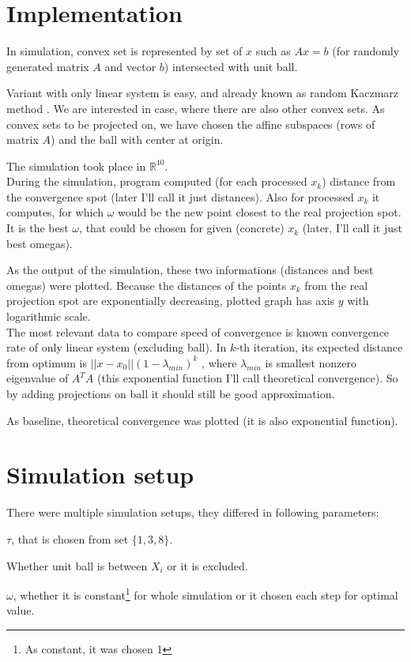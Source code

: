 \documentclass[11pt]{book}
\newcommand{\R}{\mathbb{R}}
\begin{document}
\section{Implementation}

In simulation, convex set is represented by set of $x$ such as $Ax=b$ (for randomly generated matrix $A$ and vector $b$) intersected with unit ball.

Variant with only linear system is easy, and already known as random Kaczmarz method \cite{kaczmarz, iterativeLinearSystems}. We are interested in case, where there are also other convex sets. As convex sets to be projected on, we have chosen the affine subspaces (rows of matrix $A$) and the ball with center at origin.

The simulation took place in $\R^{10}$.\\

During the simulation, program computed (for each processed $x_k$) distance from the convergence spot (later I'll call it just distances). Also for processed $x_k$ it computes, for which $\omega$ would be the new point closest to the real projection spot. It is the best $\omega$, that could be chosen for given (concrete) $x_k$ (later, I'll call it just best omegas).

As the output of the simulation, these two informations (distances and best omegas) were plotted. Because the distances of the points $x_k$ from the real projection spot are exponentially decreasing, plotted graph has axis $y$ with logarithmic scale.\\

The most relevant data to compare speed of convergence is known convergence rate of only linear system (excluding ball). In $k$-th iteration, its expected distance from optimum is $||x-x_0||(1-\lambda_{min})^k$ \cite{kaczmarz}, where $\lambda_{min}$ is smallest nonzero eigenvalue of $A^TA$ (this exponential function I'll call theoretical convergence). So by adding projections on ball it should still be good approximation.

As baseline, theoretical convergence was plotted (it is also exponential function).

\section{Simulation setup}

There were multiple simulation setups, they differed in following parameters:

\begin{list}{•}{}
	\item $\tau$, that is chosen from set $\{ 1, 3, 8 \}$.
	\item Whether unit ball is between $X_i$ or it is excluded.
	\item $\omega$, whether it is constant\footnote{As constant, it was chosen 1} for whole simulation or it chosen each step for optimal value.
\end{list}
\end{document}
